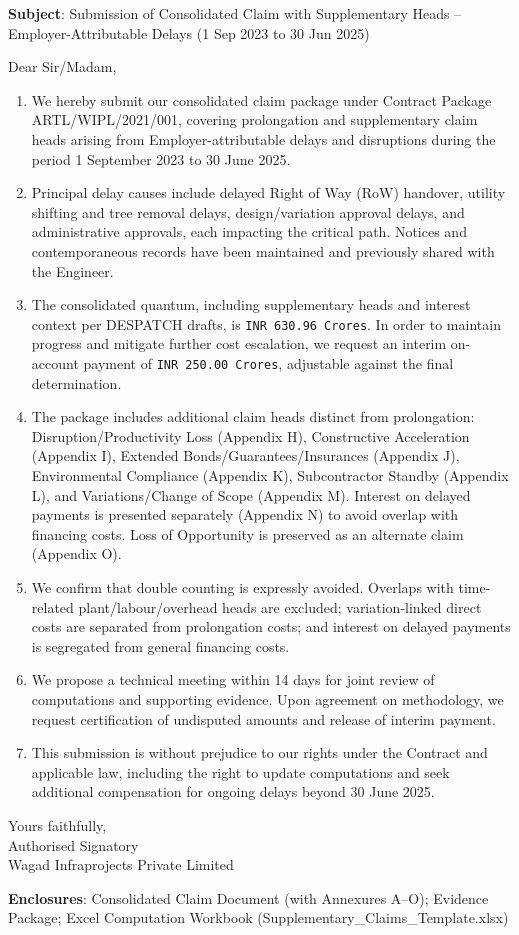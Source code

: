 \documentclass[12pt,letterpaper]{article}
\begin{document}
\textbf{Subject}: Submission of Consolidated Claim with Supplementary Heads – Employer-Attributable Delays (1 Sep 2023 to 30 Jun 2025)

Dear Sir/Madam,

\begin{enumerate}
  \item We hereby submit our consolidated claim package under Contract Package ARTL/WIPL/2021/001, covering prolongation and supplementary claim heads arising from Employer-attributable delays and disruptions during the period 1 September 2023 to 30 June 2025.
  \item Principal delay causes include delayed Right of Way (RoW) handover, utility shifting and tree removal delays, design/variation approval delays, and administrative approvals, each impacting the critical path. Notices and contemporaneous records have been maintained and previously shared with the Engineer.
  \item The consolidated quantum, including supplementary heads and interest context per DESPATCH drafts, is \texttt{INR 630.96 Crores}. In order to maintain progress and mitigate further cost escalation, we request an interim on-account payment of \texttt{INR 250.00 Crores}, adjustable against the final determination.
  \item The package includes additional claim heads distinct from prolongation: Disruption/Productivity Loss (Appendix H), Constructive Acceleration (Appendix I), Extended Bonds/Guarantees/Insurances (Appendix J), Environmental Compliance (Appendix K), Subcontractor Standby (Appendix L), and Variations/Change of Scope (Appendix M). Interest on delayed payments is presented separately (Appendix N) to avoid overlap with financing costs. Loss of Opportunity is preserved as an alternate claim (Appendix O).
  \item We confirm that double counting is expressly avoided. Overlaps with time-related plant/labour/overhead heads are excluded; variation-linked direct costs are separated from prolongation costs; and interest on delayed payments is segregated from general financing costs.
  \item We propose a technical meeting within 14 days for joint review of computations and supporting evidence. Upon agreement on methodology, we request certification of undisputed amounts and release of interim payment.
  \item This submission is without prejudice to our rights under the Contract and applicable law, including the right to update computations and seek additional compensation for ongoing delays beyond 30 June 2025.
\end{enumerate}

Yours faithfully,\\[10pt]
Authorised Signatory\\
Wagad Infraprojects Private Limited

\vspace{10pt}
\textbf{Enclosures}: Consolidated Claim Document (with Annexures A–O); Evidence Package; Excel Computation Workbook (Supplementary\_Claims\_Template.xlsx)
\end{document}
